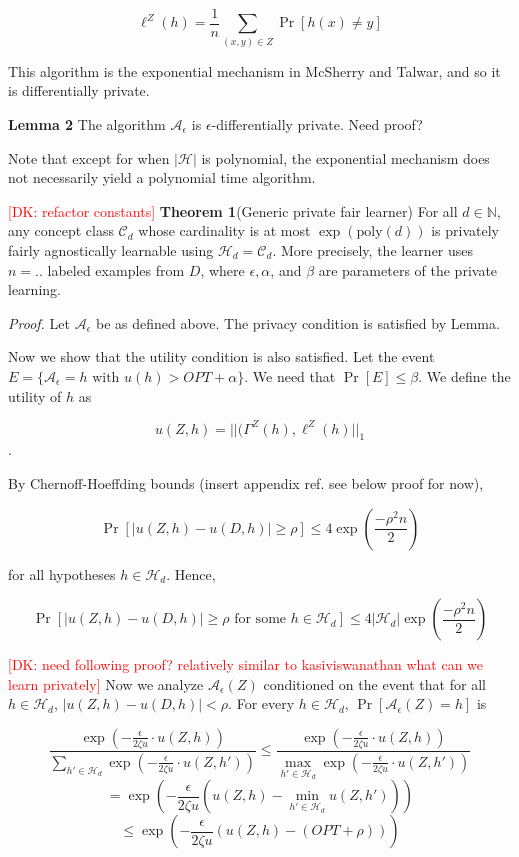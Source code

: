 \documentclass[format = sigconf]{acmart}
\newcommand{\dk}[1]{\textcolor{red}{[DK: #1]}}
\newcommand{\A}{\mathcal{A}}
\renewcommand{\H}{\mathcal{H}}
\newcommand{\C}{\mathcal{C}}
\newcommand{\1}{\mathbbm{1}}
\newcommand{\eps}{\epsilon}
\newcommand{\zt}{\zeta}
\theoremstyle{definition}
\begin{document}
$$\ell^Z(h) = \frac{1}{n} \sum_{(x,y) \in Z}\Pr[h(x) \neq y]$$



This algorithm is the exponential mechanism in McSherry and Talwar, and so it is differentially private.

{\bf Lemma 2} The algorithm $\A_\eps$ is $\eps$-differentially private.
Need proof?

Note that except for when $|\H|$ is polynomial, the exponential mechanism does not necessarily yield a polynomial time algorithm.

\dk{refactor constants}
{\bf Theorem 1}(Generic private fair learner) For all $d \in \mathbb{N}$, any concept class $\mathcal{C}_d$ whose cardinality is at most $\exp(\text{poly}(d))$ is privately fairly agnostically learnable using $\H_d = \C_d$. More precisely, the learner uses $n = ..$ labeled examples from $D$, where $\eps, \alpha$, and $\beta$ are parameters of the private learning.

{\it Proof.} Let $\A_{\eps}$ be as defined above. The privacy condition is satisfied by Lemma.

Now we show that the utility condition is also satisfied. Let the event $E = \{\A_{\eps} = h \text{ with } u(h) > OPT + \alpha\}$. We need that $\Pr[E] \leq \beta$. We define the utility of $h$ as

$$u(Z,h) = ||(\Gamma^Z(h), \ell^Z(h)||_{1}$$.

By Chernoff-Hoeffding bounds (insert appendix ref. see below proof for now),



$$\Pr[|u(Z,h) - u(D,h)| \geq \rho] \leq 4\exp(\frac{-\rho^2n}{2})$$

for all hypotheses $h \in \H_d$. Hence,

$$\Pr[|u(Z,h) - u(D,h)| \geq \rho \text{ for some } h \in \H_d] \leq 4|\H_d|\exp(\frac{-\rho^2n}{2})$$

\dk{need following proof? relatively similar to kasiviswanathan what can we learn privately}
Now we analyze $\A_\eps(Z)$ conditioned on the event that for all $h\in \H_d$, $|u(Z,h) - u(D,h)| < \rho$. For every $h \in \H_d$, $\Pr[\A_\eps(Z) = h]$ is

$$\frac{\exp(-\frac{\eps}{2\zt u} \cdot u(Z,h))}{\sum_{h'\in\H_d}\exp(-\frac{\eps}{2\zt u} \cdot u(Z,h'))} \leq \frac{\exp(-\frac{\eps}{2\zt u} \cdot u(Z,h))}{\max_{h'\in\H_d}\exp(-\frac{\eps}{2\zt u} \cdot u(Z,h'))} $$
$$= \exp(-\frac{\eps}{2\zt u}(u(Z,h) - \min_{h'\in\H_d}u(Z,h')))$$
$$\leq \exp(-\frac{\eps}{2\zt u}(u(Z,h) - (OPT + \rho)))$$
\end{document}
